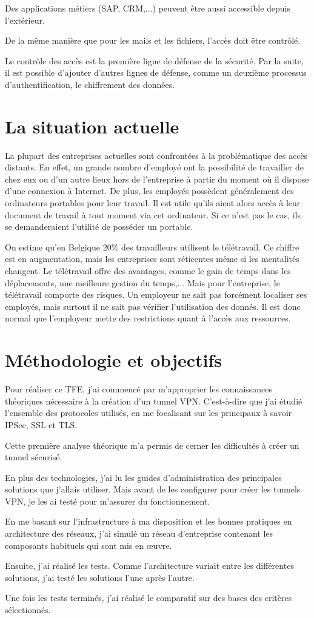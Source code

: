 Des applications métiers (SAP, CRM,...) peuvent être aussi accessible depuis l'extérieur.

De la même manière que pour les mails et les fichiers, l'accès doit être contrôlé.

Le contrôle des accès est la première ligne de défense de la sécurité.
Par la suite, il est possible d'ajouter d'autres lignes de défense, comme un deuxième processus d'authentification, le chiffrement des données.

\chapter{La situation actuelle}
La plupart des entreprises actuelles sont confrontées à la problématique des accès distants.
En effet, un grande nombre d'employé ont la possibilité de travailler de chez eux ou d'un autre lieux hors de l'entreprise à partir du moment où il dispose d'une connexion à Internet.
De plus, les employés possèdent généralement des ordinateurs portables pour leur travail.
Il est utile qu'ils aient alors accès à leur document de travail à tout moment via cet ordinateur.
Si ce n'est pas le cas, ils se demanderaient l'utilité de posséder un portable.

On estime qu'en Belgique 20\% des travailleurs utilisent le télétravail.
Ce chiffre est en augmentation, mais les entreprises sont réticentes même si les mentalités changent.
Le télétravail offre des avantages, comme le gain de temps dans les déplacements, une meilleure gestion du temps,...
Mais pour l'entreprise, le télétravail comporte des risques.
Un employeur ne sait pas forcément localiser ses employés, mais surtout il ne sait pas vérifier l'utilisation des donnés.
Il est donc normal que l'employeur mette des restrictions quant à l'accès aux ressources.
\chapter{Méthodologie et objectifs}
Pour réaliser ce TFE, j'ai commencé par m'approprier les connaissances théoriques nécessaire à la création d'un tunnel VPN.
C'est-à-dire que j'ai étudié l'ensemble des protocoles utilisés, en me focalisant sur les principaux à savoir IPSec, SSL et TLS.

Cette première analyse théorique m'a permis de cerner les difficultés à créer un tunnel sécurisé.

En plus des technologies, j'ai lu les guides d'administration des principales solutions que j'allais utiliser.
Mais avant de les configurer pour créer les tunnels VPN, je les ai testé pour m'assurer du fonctionnement.

En me basant sur l'infrastructure à ma disposition et les bonnes pratiques en architecture des réseaux, j'ai simulé un réseau d'entreprise contenant les composants habituels qui sont mis en œuvre.

Ensuite, j'ai réalisé les tests.
Comme l'architecture variait entre les différentes solutions, j'ai testé les solutions l'une après l'autre. 

Une fois les tests terminés, j'ai réalisé le comparatif sur des bases des critères sélectionnés. 